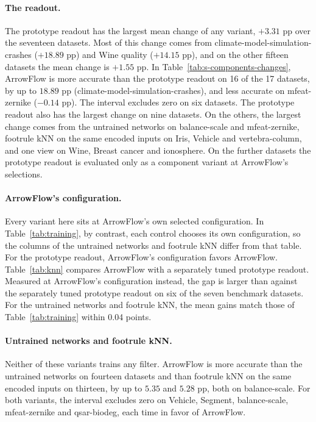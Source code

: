 \paragraph{The readout.} The prototype readout has the largest mean change of any variant, $+3.31$ pp over the seventeen datasets. Most of this change comes from climate-model-simulation-crashes ($+18.89$ pp) and Wine quality ($+14.15$ pp), and on the other fifteen datasets the mean change is $+1.55$ pp. In Table~\ref{tab:s-components-changes}, ArrowFlow is more accurate than the prototype readout on 16 of the 17 datasets, by up to $18.89$ pp (climate-model-simulation-crashes), and less accurate on mfeat-zernike ($-0.14$ pp). The interval excludes zero on six datasets. The prototype readout also has the largest change on nine datasets. On the others, the largest change comes from the untrained networks on balance-scale and mfeat-zernike, footrule kNN on the same encoded inputs on Iris, Vehicle and vertebra-column, and one view on Wine, Breast cancer and ionosphere. On the further datasets the prototype readout is evaluated only as a component variant at ArrowFlow's selections.

\paragraph{ArrowFlow's configuration.} Every variant here sits at ArrowFlow's own selected configuration. In Table~\ref{tab:training}, by contrast, each control chooses its own configuration, so the columns of the untrained networks and footrule kNN differ from that table. For the prototype readout, ArrowFlow's configuration favors ArrowFlow. Table~\ref{tab:knn} compares ArrowFlow with a separately tuned prototype readout. Measured at ArrowFlow's configuration instead, the gap is larger than against the separately tuned prototype readout on six of the seven benchmark datasets. For the untrained networks and footrule kNN, the mean gains match those of Table~\ref{tab:training} within 0.04 points.

\paragraph{Untrained networks and footrule kNN.} Neither of these variants trains any filter. ArrowFlow is more accurate than the untrained networks on fourteen datasets and than footrule kNN on the same encoded inputs on thirteen, by up to $5.35$ and $5.28$ pp, both on balance-scale. For both variants, the interval excludes zero on Vehicle, Segment, balance-scale, mfeat-zernike and qsar-biodeg, each time in favor of ArrowFlow.

